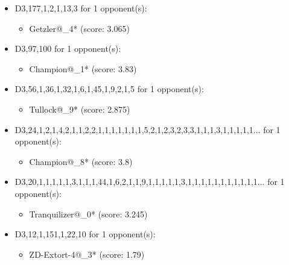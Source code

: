 \begin{appendices}
\begin{itemize}
    \item D3,177,1,2,1,13,3 for 1 opponent(s):
    \begin{multicols}{3}
         \begin{itemize}
            \item Getzler@\_4* (score: 3.065)
        \end{itemize}
     \end{multicols}
     
    \item D3,97,100 for 1 opponent(s):
    \begin{multicols}{3}
         \begin{itemize}
            \item Champion@\_1* (score: 3.83)
        \end{itemize}
     \end{multicols}
     
    \item D3,56,1,36,1,32,1,6,1,45,1,9,2,1,5 for 1 opponent(s):
    \begin{multicols}{3}
         \begin{itemize}
            \item Tullock@\_9* (score: 2.875)
        \end{itemize}
     \end{multicols}
     
    \item D3,24,1,2,1,4,2,1,1,2,2,1,1,1,1,1,1,1,5,2,1,2,3,2,3,3,1,1,1,3,1,1,1,1,1... for 1 opponent(s):
    \begin{multicols}{3}
         \begin{itemize}
            \item Champion@\_8* (score: 3.8)
        \end{itemize}
     \end{multicols}
     
    \item D3,20,1,1,1,1,1,3,1,1,1,44,1,6,2,1,1,9,1,1,1,1,1,3,1,1,1,1,1,1,1,1,1,1,1... for 1 opponent(s):
    \begin{multicols}{3}
         \begin{itemize}
            \item Tranquilizer@\_0* (score: 3.245)
        \end{itemize}
     \end{multicols}
     
    \item D3,12,1,151,1,22,10 for 1 opponent(s):
    \begin{multicols}{3}
         \begin{itemize}
            \item ZD-Extort-4@\_3* (score: 1.79)
        \end{itemize}
     \end{multicols}
     

\end{itemize}
\end{appendices}
